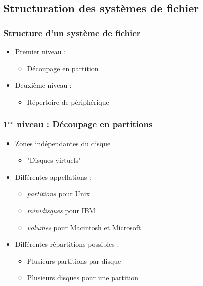\subsection{Structuration des systèmes de fichier}
\begin{frame}
\frametitle{Structure d'un système de fichier}
\begin{itemize}
\item Premier niveau :
\begin{itemize}
\item Découpage en partition
\end{itemize}
\item Deuxième niveau :
\begin{itemize}
\item Répertoire de périphérique
\end{itemize}
\end{itemize}
\end{frame}

\begin{frame}
\frametitle{1$^{er}$ niveau : Découpage en partitions}
\begin{itemize}
\item Zones indépendantes du disque
\begin{itemize}
\item "Disques virtuels"
\end{itemize}
\item Différentes appellations :
\begin{itemize}
\item \textit{partitions} pour Unix
\item \textit{minidisques} pour IBM
\item \textit{volumes} pour Macintosh et Microsoft
\end{itemize}
\item Différentes répartitions possibles :
\begin{itemize}
\item Plusieurs partitions par disque
\item Plusieurs disques pour une partition
\end{itemize}
\end{itemize}
\end{frame}

